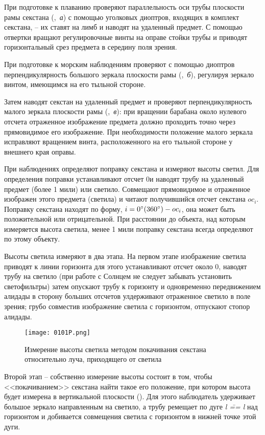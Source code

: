 При подготовке к плаванию проверяют параллельность оси трубы плоскости
рамы секстана (,~\textit{а}) с помощью уголковых диоптров,
входящих в комплект секстана, \--- их ставят на лимб и наводят на
удаленный предмет. С помощью отвертки вращают регулировочные винты на
оправе стойки трубы и приводят горизонтальный срез предмета в середину
поля зрения.

При подготовке к морским наблюдениям проверяют с помощью диоптров
перпендикулярность большого зеркала плоскости рамы (,~\textit{б}),
регулируя зеркало винтом, имеющимся на его тыльной стороне.

Затем наводят секстан на удаленный предмет и проверяют
перпендикулярность малого зеркала плоскости рамы (,~\textit{в}): при
вращении барабана около нулевого отсчета отраженное изображение
предмета должно проходить точно через прямовидимое его
изображение. При необходимости положение малого зеркала исправляют
вращением винта, расположенного на его тыльной стороне у внешнего края
оправы.

При наблюдениях определяют поправку секстана и измеряют высоты
светил. Для определения поправки устанавливают отсчет 0\gr и наводят
трубу на удаленный предмет (более 1 мили) или светило. Совмещают
прямовидимое и отраженное изображен этого предмета (светила) и читают
получившийся отсчет секстана $oc_i$. Поправку секстана находят по форму,
$i = 0^\circ (360^\circ) - oc_i$, она может быть положительной или
отрицательной. При расстоянии до объекта, над которым измеряется
высота светила, менее 1 мили поправку секстана всегда определяют по
этому объекту.

Высоты светила измеряют в два этапа. На первом этапе изображение
светила приводят к линии горизонта для этого устанавливают отсчет
около 0\gr, наводят трубу на светило (при работе с Солнцем не следует
забывать установить светофильтры) затем опускают трубу к горизонту и
одновременно передвижением алидады в сторону больших отсчетов
улдерживают отраженное светило в поле зрения; грубо совместив
изображение светила с горизонтом, отпускают стопор алидады.

\begin{figure*}[!htb]
  \centering
  \texttt{[image: 0101P.png]}
  \caption{Измерение высоты светила методом покачивания секстана
    относительно луча, приходящего от светила}
  \label{fig:101}
\end{figure*}

Второй этап \--- собственно измерение высоты состоит в том, чтобы
<<покачиванием>> секстана найти такое его положение, при котором высота
будет измерена в вертикальной плоскости (). Для этого
наблюдатель удерживает большое зеркало направленным на светило, а
трубу ремещает по дуге \textit{l \=== l} над горизонтом и добивается совмещения
светила с горизонтом в нижней точке этой дуги.


